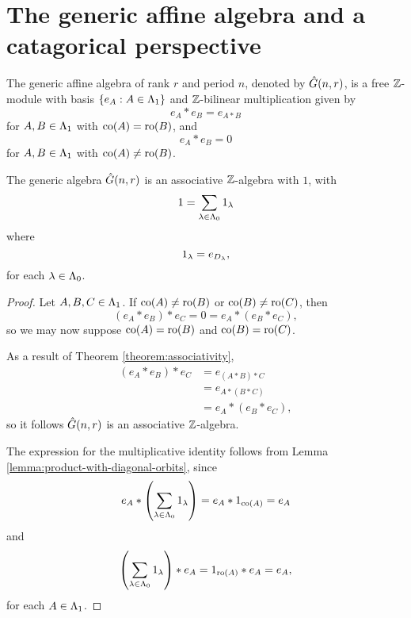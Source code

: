 \documentclass[a4paper, 11pt, twoside]{report}
\begin{document}
\section{The generic affine algebra and a catagorical perspective}

The generic affine algebra of rank $r$ and period $n$, denoted by $\hat{G}(n,r)$, is a free $\mathbb{Z}$-module with basis $\{e_A:A\in\Lambda_1{}\}$ and $\mathbb{Z}$-bilinear multiplication given by
\begin{equation*}
e_A\ast e_B = e_{A\ast B}
\end{equation*}
for $A,B\in\Lambda_1{}$ with $\operatorname{co}(A)=\operatorname{ro}(B)$, and
\begin{equation*}
e_A\ast e_B = 0
\end{equation*}
for $A,B\in\Lambda_1{}$ with $\operatorname{co}(A)\neq\operatorname{ro}(B)$.

\begin{theorem}\label{theorem:generic-algebra-associative}
The generic algebra $\hat{G}(n,r)$ is an associative $\mathbb{Z}$-algebra with $1$, with
\begin{equation*}
1=\sum_{\lambda\in\Lambda_0{}} 1_\lambda
\end{equation*}
where
\begin{equation*}
1_\lambda = e_{D_{\lambda}},
\end{equation*}
for each $\lambda\in\Lambda_0{}$.
\end{theorem}

\begin{proof}
Let $A,B,C\in\Lambda_1{}$. If $\operatorname{co}(A)\neq\operatorname{ro}(B)$ or $\operatorname{co}(B)\neq\operatorname{ro}(C)$, then
\begin{equation*}
(e_A\ast e_B)\ast e_C = 0 = e_A\ast (e_B\ast e_C),
\end{equation*}
so we may now suppose $\operatorname{co}(A)=\operatorname{ro}(B)$ and $\operatorname{co}(B)=\operatorname{ro}(C)$.

As a result of Theorem \ref{theorem:associativity},
\begin{align*}
(e_A\ast e_B)\ast e_C &= e_{(A\ast B)\ast C}\\
&= e_{A\ast (B\ast C)}\\
&= e_A\ast (e_B\ast e_C),
\end{align*}
so it follows $\hat{G}(n,r)$ is an associative $\mathbb{Z}$-algebra.

The expression for the multiplicative identity follows from Lemma \ref{lemma:product-with-diagonal-orbits}, since
\begin{equation*}
e_A\ast \left(\sum_{\lambda\in\Lambda_0{}} 1_\lambda\right) = e_A\ast 1_{\operatorname{co}(A)} = e_A
\end{equation*}
and
\begin{equation*}
\left(\sum_{\lambda\in\Lambda_0{}} 1_\lambda\right)\ast e_A = 1_{\operatorname{ro}(A)}\ast e_A = e_A,
\end{equation*} 
for each $A\in\Lambda_1{}$.
\end{proof}
\end{document}
